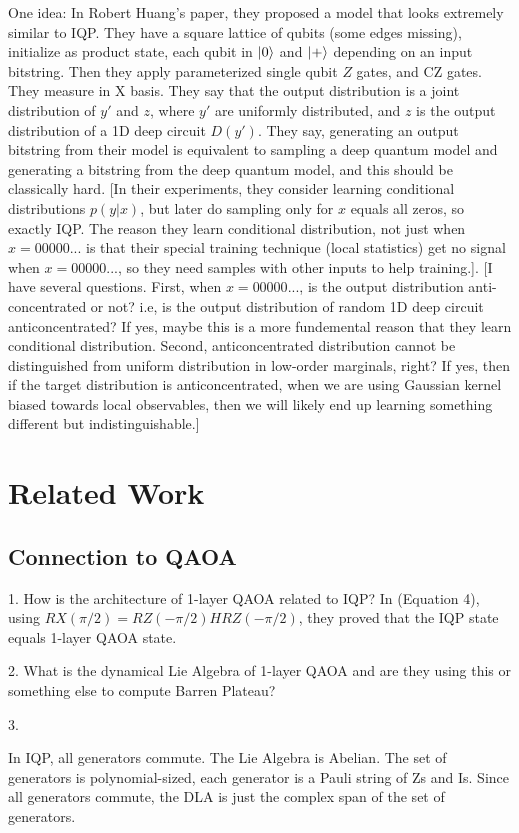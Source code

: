 \documentclass[a4paper,onecolumn,notitlepage,nofootinbib,longbibliography,superscriptaddress, floatfix, pra, aps, 10pt]{revtex4-2}
\newcommand{\cmt}[1]{{\color{blue}[#1]}}
\begin{document}
One idea: In Robert Huang's paper, they proposed a model that looks extremely similar to IQP. They have a square lattice of qubits (some edges missing), initialize as product state, each qubit in $\ket{0}$ and $\ket{+}$ depending on an input bitstring. Then they apply parameterized single qubit $Z$ gates, and CZ gates. They measure in X basis. They say that the output distribution is a joint distribution of $y'$ and $z$, where $y'$ are uniformly distributed, and $z$ is the output distribution of a 1D deep circuit $D(y')$. They say, generating an output bitstring from their model is equivalent to sampling a deep quantum model and generating a bitstring from the deep quantum model, and this should be classically hard. \cmt{In their experiments, they consider learning conditional distributions $p(y|x)$, but later do sampling only for $x$ equals all zeros, so exactly IQP. The reason they learn conditional distribution, not just when $x=00000...$ is that their special training technique (local statistics) get no signal when $x=00000...$, so they need samples with other inputs to help training.}. \cmt{I have several questions. First, when $x=00000...$, is the output distribution anti-concentrated or not? i.e, is the output distribution of random 1D deep circuit anticoncentrated? If yes, maybe this is a more fundemental reason that they learn conditional distribution. Second, anticoncentrated distribution cannot be distinguished from uniform distribution in low-order marginals, right? If yes, then if the target distribution is anticoncentrated, when we are using Gaussian kernel biased towards local observables, then we will likely end up learning something different but indistinguishable.} 

\newpage
\section{Related Work}
\subsection{Connection to QAOA}
1. How is the architecture of 1-layer QAOA related to IQP?
In \cite{Leontica_2024} (Equation 4), using $RX(\pi/2) = RZ(-\pi/2)HRZ(-\pi/2)$, they proved that the IQP state equals 1-layer QAOA state.

2. What is the dynamical Lie Algebra of 1-layer QAOA and are they using this or something else to compute Barren Plateau?

3. 

In IQP, all generators commute. The Lie Algebra is Abelian. The set of generators is polynomial-sized, each generator is a Pauli string of Zs and Is. Since all generators commute, the DLA is just the complex span of the set of generators. 
\end{document}
